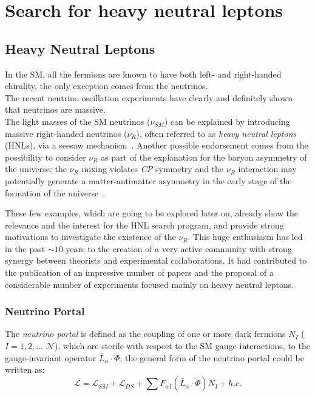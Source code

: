 
\part {Search for heavy neutral leptons}


\chapter{Heavy Neutral Leptons} 
\label{Chapter3} 


In the SM, all the fermions are known to have both left- and right-handed chirality, the only exception comes from the neutrinos.\\
The recent neutrino oscillation experiments have clearly and
definitely shown that neutrinos are massive.\\
The light masses of the SM neutrinos ($\nu_{SM}$) can be explained by introducing massive right-handed neutrinos ($\nu_{R}$), often referred to as \emph{heavy neutral leptons} (HNLs), via a seesaw mechanism~\cite{MINKOWSKI1977421,gellmann2013complex,PhysRevLett.44.912,PhysRevD.22.2227}.
Another possible endorsement comes from the possibility to consider
$\nu_{R}$ as part of the explanation for the baryon asymmetry of the
universe; the $\nu_{R}$ mixing violates \emph{CP} symmetry and the $\nu_{R}$ interaction may potentially generate a matter-antimatter asymmetry in the early stage of the formation of the universe~\cite{Canetti_2012,KUZMIN198536}.

These few examples, which are going to be explored later on, already
show the relevance and the interest for the HNL search program, and
provide strong motivations to investigate the existence of the
$\nu_{R}$. This huge enthusiasm has led in the past $\sim10$ years to
the creation of a very active community with strong synergy between
theorists and experimental collaborations. It had contributed to the publication of an impressive number of papers and the proposal of a considerable number of experiments focused mainly on heavy neutral leptons. 

\section{Neutrino Portal} \label{sec:neutrinoPortal}
The \emph{neutrino portal} is defined as the coupling of one or more dark fermions $N_{I}$  ($I = 1,2,...$ $\mathcal{N}$), which are sterile with respect to the SM gauge interactions, to the gauge-invariant operator $\bar{L}_{\alpha}  \cdot \widetilde \Phi$; the general form of the neutrino portal could be written as: 
\begin{equation}
\label{eq:neutrinoportal}
\mathcal{L} = \mathcal{L}_{SM} + \mathcal{L}_{DS} + \sum F_{\alpha I} (\bar{L}_{\alpha}  \cdot \widetilde \Phi)N_{I} + h.c.
\end{equation}

